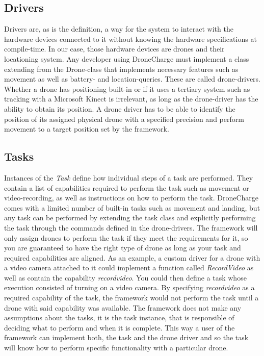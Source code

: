 \subsection{Drivers}
Drivers are, as is the definition, a way for the system to interact with the hardware devices connected to it without knowing the hardware specifications at compile-time. In our case, those hardware devices are drones and their locationing system. Any developer using DroneCharge must implement a class extending from the Drone-class that implements necessary features such as movement as well as battery- and location-queries. These are called drone-drivers. Whether a drone has positioning built-in or if it uses a tertiary system such as tracking with a Microsoft Kinect is irrelevant, as long as the drone-driver has the ability to obtain its position. A drone driver has to be able to identify the position of its assigned physical drone with a specified precision and perform movement to a target position set by the framework.

\subsection{Tasks}
Instances of the \textit{Task} define how individual steps of a task are performed. They contain a list of capabilities required to perform the task such as movement or video-recording, as well as instructions on how to perform the task. DroneCharge comes with a limited number of built-in tasks such as movement and landing, but any task can be performed by extending the task class and explicitly performing the task through the commands defined in the drone-drivers. The framework will only assign drones to perform the task if they meet the requirements for it, so you are guaranteed to have the right type of drone as long as your task and required capabilities are aligned. As an example, a custom driver for a drone with a video camera attached to it could implement a function called \textit{RecordVideo} as well as contain the capability \textit{recordvideo}. You could then define a task whose execution consisted of turning on a video camera. By specifying \textit{recordvideo} as a required capability of the task, the framework would not perform the task until a drone with said capability was available. The framework does not make any assumptions about the tasks, it is the task instance, that is responsible of deciding what to perform and when it is complete. This way a user of the framework can implement both, the task and the drone driver and so the task will know how to perform specific functionality with a particular drone.

